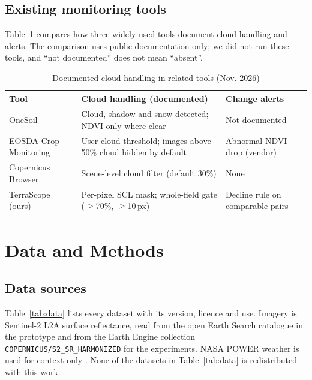 \documentclass[conference]{IEEEtran}
\begin{document}
\subsection{Existing monitoring tools}
Table~\ref{tab:tools} compares how three widely used tools document cloud handling and alerts. The comparison uses public documentation only; we did not run these tools, and ``not documented'' does not mean ``absent''.

\begin{table}[t]
\caption{Documented cloud handling in related tools (Nov. 2026)}
\label{tab:tools}
\centering
\footnotesize
\begin{tabular}{@{}p{1.55cm}p{3.7cm}p{1.9cm}@{}}
\toprule
Tool & Cloud handling (documented) & Change alerts \\
\midrule
OneSoil \cite{r21} & Cloud, shadow and snow detected; NDVI only where clear & Not documented \\
EOSDA Crop Monitoring \cite{r22} & User cloud threshold; images above 50\% cloud hidden by default & Abnormal NDVI drop (vendor) \\
Copernicus Browser \cite{r23} & Scene-level cloud filter (default 30\%) & None \\
TerraScope (ours) & Per-pixel SCL mask; whole-field gate ($\geq$70\%, $\geq$10\,px) & Decline rule on comparable pairs \\
\bottomrule
\end{tabular}
\end{table}

\section{Data and Methods}
\subsection{Data sources}
Table~\ref{tab:data} lists every dataset with its version, licence and use. Imagery is Sentinel-2 L2A surface reflectance, read from the open Earth Search catalogue in the prototype and from the Earth Engine collection \texttt{COPERNICUS/S2\_SR\_HARMONIZED} \cite{r24} for the experiments. NASA POWER weather is used for context only \cite{r25}. None of the datasets in Table~\ref{tab:data} is redistributed with this work.
\end{document}
